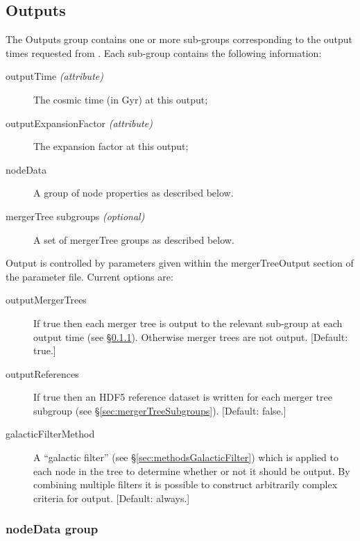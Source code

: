 \subsection{Outputs}

The {\normalfont \ttfamily Outputs} group contains one or more sub-groups corresponding to the output times requested from \glc. Each sub-group contains the following information:
\begin{description}
 \item[{\normalfont \ttfamily outputTime} \emph{(attribute)}] The cosmic time (in Gyr) at this output;
 \item[{\normalfont \ttfamily outputExpansionFactor} \emph{(attribute)}] The expansion factor at this output;
 \item[{\normalfont \ttfamily nodeData}] A group of node properties as described below.
 \item[{\normalfont \ttfamily mergerTree} subgroups \emph{(optional)}] A set of {\normalfont \ttfamily mergerTree} groups as described below.
\end{description}

Output is controlled by parameters given within the {\normalfont \ttfamily mergerTreeOutput} section of the parameter file. Current options are:
\begin{description}
\item[{\normalfont \ttfamily outputMergerTrees}] If {\normalfont \ttfamily true} then each merger tree is output to the relevant sub-group at each output time (see \S\ref{sec:nodeDataGroup}). Otherwise merger trees are not output. [Default: {\normalfont \ttfamily true}.]
\item[{\normalfont \ttfamily outputReferences}] If {\normalfont \ttfamily true} then an HDF5 reference dataset is written for each merger tree subgroup (see \S\ref{sec:mergerTreeSubgroups}). [Default: {\normalfont \ttfamily false}.]
\item[{\normalfont \ttfamily galacticFilterMethod}] A ``galactic filter'' (see \S\ref{sec:methodsGalacticFilter}) which is applied to each node in the tree to determine whether or not it should be output. By combining multiple filters it is possible to construct arbitrarily complex criteria for output. [Default: {\normalfont \ttfamily always}.]
\end{description}

\subsubsection{nodeData group}\label{sec:nodeDataGroup}

